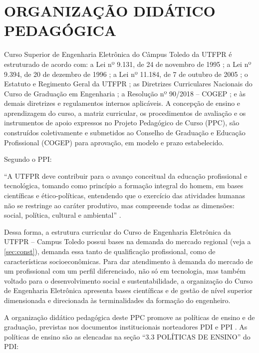 \chapter{ORGANIZAÇÃO DIDÁTICO PEDAGÓGICA}

Curso Superior de Engenharia Eletrônica do Câmpus Toledo da UTFPR  é estruturado de acordo com: a Lei nº 9.131, de 24 de novembro de 1995 \cite{Lei:9131:1995}; a Lei nº 9.394, de 20 de dezembro de 1996 \cite{Lei:9394:1996}; a Lei nº 11.184, de 7 de outubro de 2005 \cite{Lei:11.184:2005}; o Estatuto e Regimento Geral da UTFPR \cite{estatutoutfpr}; as Diretrizes Curriculares Nacionais do Curso de Graduação em Engenharia \cite{dcneng}; a Resolução nº 90/2018 – COGEP \cite{cogep90}; e às demais diretrizes e regulamentos internos aplicáveis. A concepção de ensino e aprendizagem do curso, a matriz curricular, os procedimentos de avaliação e os instrumentos de apoio expressos no Projeto Pedagógico de Curso (PPC), são construídos coletivamente e submetidos ao Conselho de Graduação e Educação Profissional (COGEP) para aprovação, em modelo e prazo estabelecido.

Segundo o PPI:

\begin{citacao}
	``A  UTFPR  deve  contribuir  para  o  avanço  conceitual  da educação profissional e tecnológica, tomando como princípio a formação integral do homem,  em  bases  científicas  e  ético-políticas,  entendendo  que  o  exercício  das atividades humanas não se restringe ao caráter produtivo, mas compreende todas as dimensões: social, política, cultural e ambiental'' \cite{ppiutfpr}.
\end{citacao}

Dessa forma, a estrutura curricular do Curso de Engenharia Eletrônica da UTFPR – Campus Toledo possui bases na demanda do mercado regional (veja a \autoref{sec:const}), demanda essa tanto de qualificação profissional, como de características socioeconômicas. Para dar atendimento à demanda do mercado de um profissional com um perfil diferenciado, não só em tecnologia, mas também voltado para o desenvolvimento social e sustentabilidade, a organização do Curso de Engenharia Eletrônica apresenta bases científicas e de gestão de nível superior dimensionada e direcionada às terminalidades da formação do engenheiro.

A organização didático pedagógica deste PPC promove as políticas de ensino e de graduação, previstas nos documentos institucionais norteadores PDI \cite{pdiutfpr} e PPI \cite{ppiutfpr}. As políticas de ensino são as elencadas na seção ``3.3 POLÍTICAS DE ENSINO'' do PDI:

